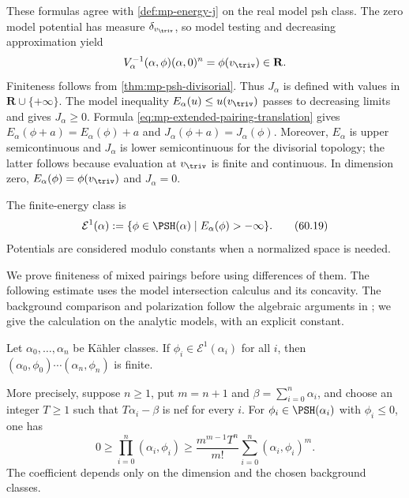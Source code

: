 These formulas agree with \cref{def:mp-energy-j} on the real model psh class. The zero model potential has measure $\delta_{v_{\triv}}$, so model testing and decreasing approximation yield
\[
 V_\alpha^{-1}(\alpha,\phi)(\alpha,0)^n
       =\phi(v_{\triv})\in\mathbf R.
\]
Finiteness follows from \cref{thm:mp-psh-divisorial}. Thus $J_\alpha$ is defined with values in $\mathbf R\cup\{+\infty\}$. The model inequality $E_\alpha(u)\leq u(v_{\triv})$ passes to decreasing limits and gives $J_\alpha\geq0$. Formula \eqref{eq:mp-extended-pairing-translation} gives $E_\alpha(\phi+a)=E_\alpha(\phi)+a$ and $J_\alpha(\phi+a)=J_\alpha(\phi)$. Moreover, $E_\alpha$ is upper semicontinuous and $J_\alpha$ is lower semicontinuous for the divisorial topology; the latter follows because evaluation at $v_{\triv}$ is finite and continuous. In dimension zero, $E_\alpha(\phi)=\phi(v_{\triv})$ and $J_\alpha=0$.

\begin{definition}\label{def:mp-e1}
The finite-energy class is
\[
 \mathcal E^1(\alpha)
 :=\{\phi\in\PSH(\alpha)\mid E_\alpha(\phi)>-\infty\}.
\tag{60.19}\label{eq:mp-e1}
\]
Potentials are considered modulo constants when a normalized space is needed.
\end{definition}

We prove finiteness of mixed pairings before using differences of them. The following estimate uses the model intersection calculus and its concavity. The background comparison and polarization follow the algebraic arguments in \cite[Lemma~7.9 and Corollary~7.11, pp.~752--753]{BJ22}; we give the calculation on the analytic models, with an explicit constant.

\begin{proposition}\label{prop:mp-mixed-energy-finite}
Let $\alpha_0,\ldots,\alpha_n$ be K\"ahler classes. If $\phi_i\in\mathcal E^1(\alpha_i)$ for all $i$, then $(\alpha_0,\phi_0)\cdots(\alpha_n,\phi_n)$ is finite.

More precisely, suppose $n\geq1$, put $m=n+1$ and $\beta=\sum_{i=0}^n\alpha_i$, and choose an integer $T\geq1$ such that $T\alpha_i-\beta$ is nef for every $i$. For $\phi_i\in\PSH(\alpha_i)$ with $\phi_i\leq0$, one has
\[
 0\geq\prod_{i=0}^n(\alpha_i,\phi_i)
 \geq\frac{m^{m-1}T^n}{m!}
       \sum_{i=0}^n(\alpha_i,\phi_i)^m.
\tag{60.19a}\label{eq:mp-mixed-energy-bound}
\]
The coefficient depends only on the dimension and the chosen background classes.
\end{proposition}

